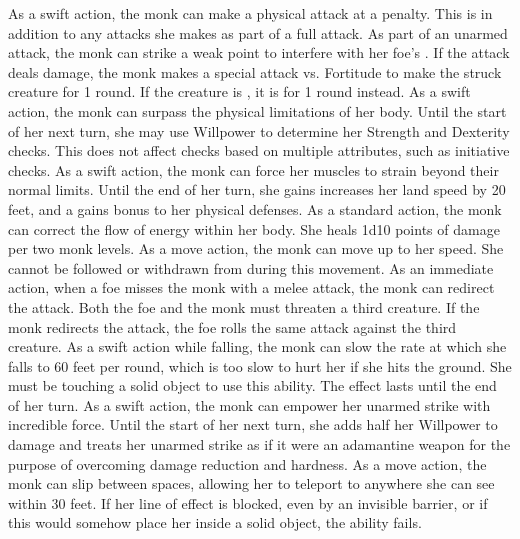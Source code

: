 As a swift action, the monk can make a physical attack at a  penalty.
This is in addition to any attacks she makes as part of a full attack.
As part of an unarmed attack, the monk can strike a weak point to interfere with her foe's \ki.
If the attack deals damage, the monk makes a special attack vs. Fortitude to make the struck creature \staggered for 1 round.
If the creature is \bloodied, it is \stunned for 1 round instead.
As a swift action, the monk can surpass the physical limitations of her body.
Until the start of her next turn, she may use Willpower to determine her Strength and Dexterity checks.
This does not affect checks based on multiple attributes, such as initiative checks.
As a swift action, the monk can force her muscles to strain beyond their normal limits.
Until the end of her turn, she gains increases her land speed by 20 feet, and a gains  bonus to her physical defenses.
As a standard action, the monk can correct the flow of energy within her body.
She heals 1d10 points of damage per two monk levels.
As a move action, the monk can move up to her speed.
She cannot be followed or withdrawn from during this movement.
As an immediate action, when a foe misses the monk with a melee attack, the monk can redirect the attack.
Both the foe and the monk must threaten a third creature.
If the monk redirects the attack, the foe rolls the same attack against the third creature.
As a swift action while falling, the monk can slow the rate at which she falls to 60 feet per round, which is too slow to hurt her if she hits the ground.
She must be touching a solid object to use this ability.
The effect lasts until the end of her turn.
As a swift action, the monk can empower her unarmed strike with incredible force.
Until the start of her next turn, she adds half her Willpower to damage and treats her unarmed strike as if it were an adamantine weapon for the purpose of overcoming damage reduction and hardness.
As a move action, the monk can slip between spaces, allowing her to teleport to anywhere she can see within 30 feet.
If her line of effect is blocked, even by an invisible barrier, or if this would somehow place her inside a solid object, the ability fails.

